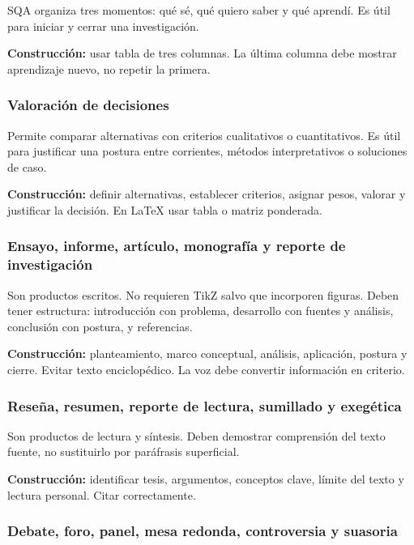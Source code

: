 SQA organiza tres momentos: qué sé, qué quiero saber y qué aprendí. Es útil para iniciar y cerrar una investigación.

\textbf{Construcción:} usar tabla de tres columnas. La última columna debe mostrar aprendizaje nuevo, no repetir la primera.

\subsubsection*{Valoración de decisiones}

Permite comparar alternativas con criterios cualitativos o cuantitativos. Es útil para justificar una postura entre corrientes, métodos interpretativos o soluciones de caso.

\textbf{Construcción:} definir alternativas, establecer criterios, asignar pesos, valorar y justificar la decisión. En LaTeX usar tabla o matriz ponderada.

\subsubsection*{Ensayo, informe, artículo, monografía y reporte de investigación}

Son productos escritos. No requieren TikZ salvo que incorporen figuras. Deben tener estructura: introducción con problema, desarrollo con fuentes y análisis, conclusión con postura, y referencias.

\textbf{Construcción:} planteamiento, marco conceptual, análisis, aplicación, postura y cierre. Evitar texto enciclopédico. La voz debe convertir información en criterio.

\subsubsection*{Reseña, resumen, reporte de lectura, sumillado y exegética}

Son productos de lectura y síntesis. Deben demostrar comprensión del texto fuente, no sustituirlo por paráfrasis superficial.

\textbf{Construcción:} identificar tesis, argumentos, conceptos clave, límite del texto y lectura personal. Citar correctamente.

\subsubsection*{Debate, foro, panel, mesa redonda, controversia y suasoria}

